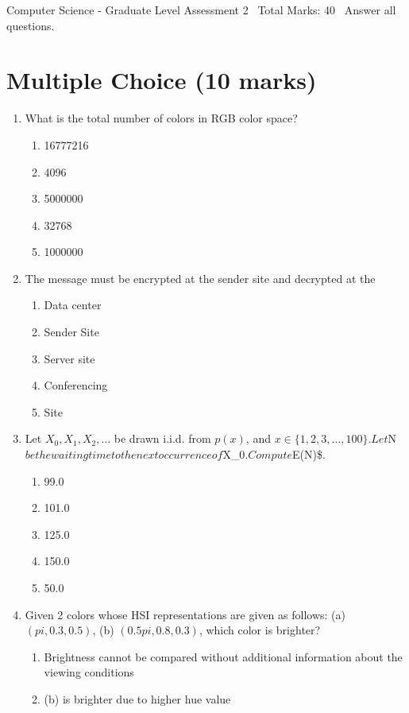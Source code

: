 \documentclass[12pt]{article}
\begin{document}
\begin{center}
Computer Science - Graduate Level Assessment 2 \
Total Marks: 40 \
Answer all questions.
\end{center}

\section*{Multiple Choice (10 marks)}
\begin{enumerate}[label=\arabic*.]
\item What is the total number of colors in RGB color space?
\begin{enumerate}[label=(\alph*)]
    \item 16777216
    \item 4096
    \item 5000000
    \item 32768
    \item 1000000
\end{enumerate}
\item The message must be encrypted at the sender site and decrypted at the
\begin{enumerate}[label=(\alph*)]
    \item Data center
    \item Sender Site
    \item Server site
    \item Conferencing
    \item Site
\end{enumerate}
\item Let $X_0, X_1, X_2, \ldots$ be drawn i.i.d. from $p(x)$, and $x\in\{1,2,3,\ldots,100\}.
Let $N$ be the waiting time to the next occurrence of $X\_0$. Compute $E(N)\$.
\begin{enumerate}[label=(\alph*)]
    \item 99.0
    \item 101.0
    \item 125.0
    \item 150.0
    \item 50.0
\end{enumerate}
\item Given 2 colors whose HSI representations are given as follows: (a) $(pi, 0.3,0.5)$, (b)
$(0.5 pi, 0.8,0.3)$, which color is brighter?
\begin{enumerate}[label=(\alph*)]
    \item Brightness cannot be compared without additional information about the viewing conditions
    \item (b) is brighter due to higher hue value

\end{enumerate}
\end{enumerate}
\end{document}
